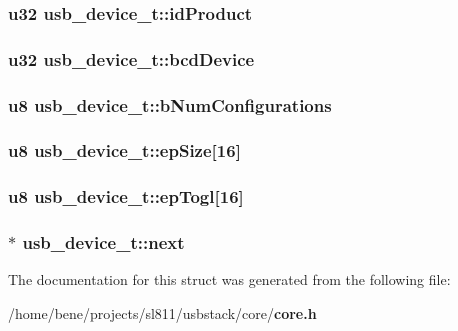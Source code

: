 \subsubsection{\setlength{\rightskip}{0pt plus 5cm}u32 {\bf usb\_\-device\_\-t::id\-Product}}\label{structusb__device__t_7223156cbda0b6f3bea8092d49fdc523}


\subsubsection{\setlength{\rightskip}{0pt plus 5cm}u32 {\bf usb\_\-device\_\-t::bcd\-Device}}\label{structusb__device__t_d0d78eaeaeafa6c6243916bcceace5fd}


\subsubsection{\setlength{\rightskip}{0pt plus 5cm}u8 {\bf usb\_\-device\_\-t::b\-Num\-Configurations}}\label{structusb__device__t_4a0e2ee559e2462e157c8453211cf673}


\subsubsection{\setlength{\rightskip}{0pt plus 5cm}u8 {\bf usb\_\-device\_\-t::ep\-Size}[16]}\label{structusb__device__t_e88ea3096ed88d5ba607a84d77bde363}


\subsubsection{\setlength{\rightskip}{0pt plus 5cm}u8 {\bf usb\_\-device\_\-t::ep\-Togl}[16]}\label{structusb__device__t_fd545904a6dae169f5827d3e885f07c8}


\subsubsection{$\ast$ {\bf usb\_\-device\_\-t::next}}\label{structusb__device__t_f299a57fe66fae228962460aac27965f}




The documentation for this struct was generated from the following file:\begin{CompactItemize}
\item 
/home/bene/projects/sl811/usbstack/core/{\bf core.h}\end{CompactItemize}
